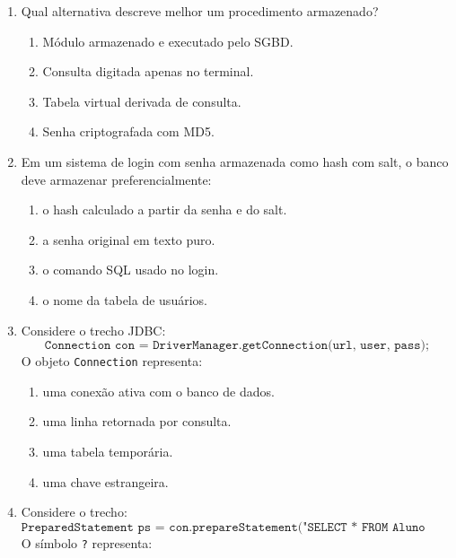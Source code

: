 \documentclass[12pt,a4paper]{article}
\begin{document}
\begin{enumerate}[resume,label=\textbf{Q\arabic*.}]
\begin{enumerate}[label=\alph*)]
    \item Hibernate.
    \item SQL Injection.
    \item \texttt{FETCH}.
    \item SQLCODE.
\end{enumerate}

\item Qual alternativa descreve melhor um procedimento armazenado?

\begin{enumerate}[label=\alph*)]
    \item Módulo armazenado e executado pelo SGBD.
    \item Consulta digitada apenas no terminal.
    \item Tabela virtual derivada de consulta.
    \item Senha criptografada com MD5.
\end{enumerate}

\item Em um sistema de login com senha armazenada como hash com salt, o banco deve armazenar preferencialmente:

\begin{enumerate}[label=\alph*)]
    \item o hash calculado a partir da senha e do salt.
    \item a senha original em texto puro.
    \item o comando SQL usado no login.
    \item o nome da tabela de usuários.
\end{enumerate}

\item Considere o trecho JDBC:
\[
\texttt{Connection con = DriverManager.getConnection(url, user, pass);}
\]
O objeto \texttt{Connection} representa:

\begin{enumerate}[label=\alph*)]
    \item uma conexão ativa com o banco de dados.
    \item uma linha retornada por consulta.
    \item uma tabela temporária.
    \item uma chave estrangeira.
\end{enumerate}

\item Considere o trecho:
\[
\texttt{PreparedStatement ps = con.prepareStatement("SELECT * FROM Aluno WHERE matricula = ?");}
\]
O símbolo \texttt{?} representa:


\end{enumerate}
\end{document}
